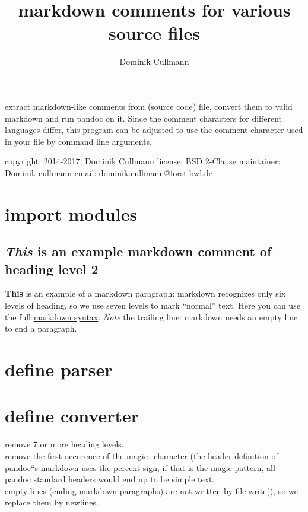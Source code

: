 \documentclass[]{article}
\title{markdown comments for various source files}
\author{Dominik Cullmann}
\date{}
\begin{document}
\maketitle

extract markdown-like comments from (source code) file, convert them to
valid markdown and run pandoc on it. Since the comment characters for
different languages differ, this program can be adjusted to use the
comment character used in your file by command line arguments.

copyright: 2014-2017, Dominik Cullmann license: BSD 2-Clause maintainer:
Dominik cullmann email: dominik.cullmann@forst.bwl.de

\section{import modules}\label{import-modules}

\subsection{\texorpdfstring{\emph{This} is an example markdown comment
of heading level
2}{This is an example markdown comment of heading level 2}}\label{this-is-an-example-markdown-comment-of-heading-level-2}

\textbf{This} is an example of a markdown paragraph: markdown recognizes
only six levels of heading, so we use seven levels to mark ``normal''
text. Here you can use the full
\href{http://daringfireball.net/projects/markdown/syntax}{markdown
syntax}. \emph{Note} the trailing line: markdown needs an empty line to
end a paragraph.

\section{define parser}\label{define-parser}

\section{define converter}\label{define-converter}

remove 7 or more heading levels.\\
remove the first occurence of the magic\_character (the header
definition of pandoc``s markdown uses the percent sign, if that is the
magic pattern, all pandoc standard headers would end up to be simple
text.\\
empty lines (ending markdown paragraphs) are not written by
file.write(), so we replace them by newlines.
\end{document}
